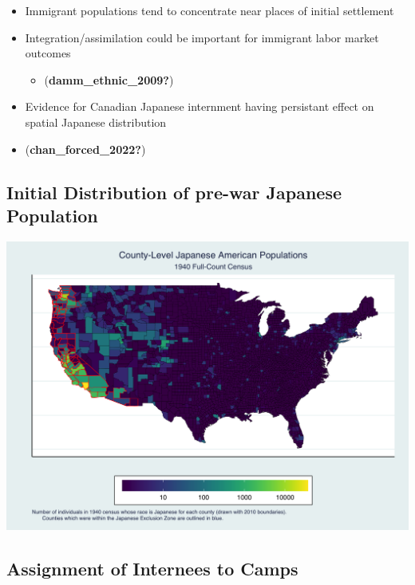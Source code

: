 \documentclass[
]{article}
\providecommand{\tightlist}{%
  \setlength{\itemsep}{0pt}\setlength{\parskip}{0pt}}\usepackage{longtable,booktabs,array}
\begin{document}
\begin{itemize}
\item
  Immigrant populations tend to concentrate near places of initial
  settlement
\item
  Integration/assimilation could be important for immigrant labor market
  outcomes

  \begin{itemize}
  \tightlist
  \item
    (\textbf{damm\_ethnic\_2009?})
  \end{itemize}
\item
  Evidence for Canadian Japanese internment having persistant effect on
  spatial Japanese distribution
\item
  (\textbf{chan\_forced\_2022?})
\end{itemize}

\subsection{Initial Distribution of pre-war Japanese
Population}\label{initial-distribution-of-pre-war-japanese-population}

\begin{center}
\includegraphics{figures/county_JAmap.png}
\end{center}

\subsection{Assignment of Internees to
Camps}\label{assignment-of-internees-to-camps}
\end{document}
